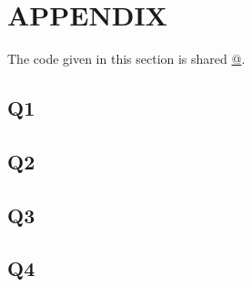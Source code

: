 \documentclass[11pt]{extarticle}
\begin{document}
\section{APPENDIX}
The code given in this section is shared \href{https://github.com/kutay-ugurlu/Pattern-Recognition/tree/master/HW5}{@\faGithubSquare}.
\subsection{Q1}\label{subsec:Q1_code}

\pagebreak
\subsection{Q2} \label{subsec:Q2_code}

\pagebreak
\subsection{Q3}\label{subsec:Q3_code}

\pagebreak
\subsection{Q4}\label{subsec:Q4_code}

\end{document}
